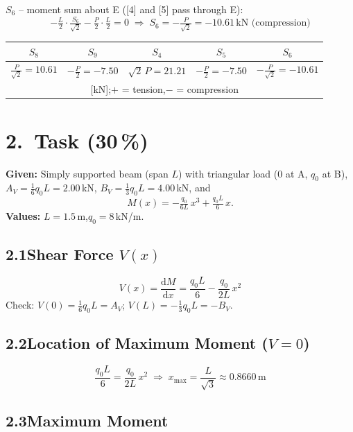 \documentclass[a4paper,11pt]{article}
\begin{document}
\textbf{$S_6$} -- moment sum about E ([4] and [5] pass through E):
\[
  -\tfrac{L}{2}\cdot\tfrac{S_6}{\sqrt{2}} - \tfrac{P}{2}\cdot\tfrac{L}{2} = 0
  \;\Rightarrow\; \boxed{S_6 = -\tfrac{P}{\sqrt{2}} = -10.61\,\text{kN (compression)}}
\]

\medskip
\begin{center}
\begin{tabular}{ccccc}
\toprule
$S_8$ & $S_9$ & $S_4$ & $S_5$ & $S_6$ \\
\midrule
$\tfrac{P}{\sqrt{2}} = 10.61$ & $-\tfrac{P}{2} = -7.50$ &
$\sqrt{2}\,P = 21.21$ & $-\tfrac{P}{2} = -7.50$ & $-\tfrac{P}{\sqrt{2}} = -10.61$ \\
\multicolumn{5}{c}{\small [kN];\quad $+$ = tension,\quad $-$ = compression} \\
\bottomrule
\end{tabular}
\end{center}

\newpage
\section*{2.~Task \hfill (30\,\%)}

\textbf{Given:} Simply supported beam (span $L$) with triangular load
(0 at A, $q_0$ at B),
$A_V = \tfrac{1}{6}q_0 L = 2.00$\,kN,
$B_V = \tfrac{1}{3}q_0 L = 4.00$\,kN, and
\[
  M(x) = -\tfrac{q_0}{6L}\,x^3 + \tfrac{q_0 L}{6}\,x.
\]
\textbf{Values:} $L = 1.5$\,m,\quad $q_0 = 8$\,kN/m.

\subsection*{2.1\quad Shear Force $V(x)$}

\[
  V(x) = \frac{\mathrm{d}M}{\mathrm{d}x}
        = \frac{q_0 L}{6} - \frac{q_0}{2L}\,x^2
\]
Check: $V(0) = \tfrac{1}{6}q_0 L = A_V$\;\checkmark;\quad
$V(L) = -\tfrac{1}{3}q_0 L = -B_V$\;\checkmark.

\subsection*{2.2\quad Location of Maximum Moment ($V = 0$)}

\[
  \frac{q_0 L}{6} = \frac{q_0}{2L}\,x^2
  \;\Rightarrow\; \boxed{x_{\max} = \frac{L}{\sqrt{3}} \approx 0.8660\,\text{m}}
\]

\subsection*{2.3\quad Maximum Moment}
\end{document}
